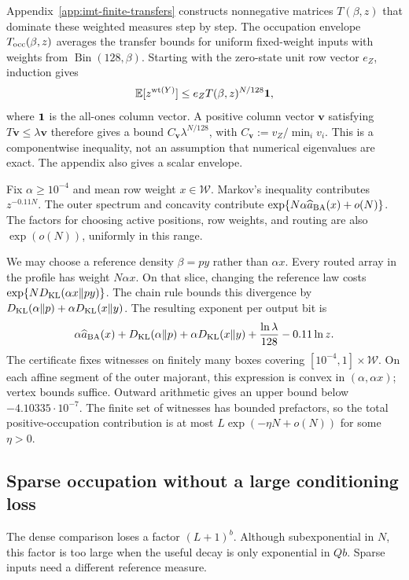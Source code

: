 Appendix~\ref{app:imt-finite-transfers} constructs nonnegative matrices
$T(\beta,z)$ that dominate these weighted measures step by step.
The occupation envelope $T_{\rm occ}(\beta,z)$ averages the transfer bounds
for uniform fixed-weight inputs with weights from $\operatorname{Bin}(128,\beta)$.
Starting with the zero-state unit row vector $e_Z$, induction gives
\[
 \mathbb E[z^{\operatorname{wt}(Y)}]\le e_Z T(\beta,z)^{N/128}\mathbf 1,
\]
where $\mathbf 1$ is the all-ones column vector.
A positive column vector $\boldsymbol v$ satisfying
$T\boldsymbol v\le\lambda\boldsymbol v$ therefore gives a bound
$C_{\boldsymbol v}\lambda^{N/128}$, with
$C_{\boldsymbol v}:=v_Z/\min_i v_i$.
This is a componentwise inequality, not an assumption that numerical
eigenvalues are exact. The appendix also gives a scalar envelope.

Fix $\alpha\ge10^{-4}$ and mean row weight $x\in\mathcal W$.
Markov's inequality contributes $z^{-0.11N}$.
The outer spectrum and concavity contribute
$\exp\{N\alpha\widehat a_{\rm BA}(x)+o(N)\}$.
The factors for choosing active positions, row weights, and routing are
also $\exp(o(N))$, uniformly in this range.

We may choose a reference density $\beta=py$ rather than $\alpha x$.
Every routed array in the profile has weight $N\alpha x$.
On that slice, changing the reference law costs
$\exp\{ND_{\rm KL}(\alpha x\Vert py)\}$.
The chain rule bounds this divergence by
$D_{\rm KL}(\alpha\Vert p)+\alpha D_{\rm KL}(x\Vert y)$.
The resulting exponent per output bit is
\[
 \alpha\widehat a_{\rm BA}(x)
 +D_{\rm KL}(\alpha\Vert p)+\alpha D_{\rm KL}(x\Vert y)
 +\frac{\ln\lambda}{128}-0.11\ln z.
\]
The certificate fixes witnesses on finitely many boxes covering
$[10^{-4},1]\times\mathcal W$. On each affine segment of the outer majorant,
this expression is convex in $(\alpha,\alpha x)$; vertex bounds suffice.
Outward arithmetic gives an upper bound below $-4.10335\cdot10^{-7}$.
The finite set of witnesses has bounded prefactors, so the total
positive-occupation contribution is at most $L\exp(-\eta N+o(N))$
for some $\eta>0$.

\subsection{Sparse occupation without a large conditioning loss}

The dense comparison loses a factor $(L+1)^b$.
Although subexponential in $N$, this factor is too large when the useful
decay is only exponential in $Qb$. Sparse inputs need a different reference
measure.

